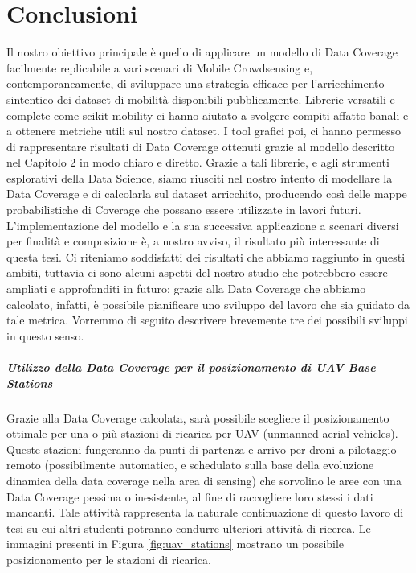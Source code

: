 \chapter{Conclusioni}

Il nostro obiettivo principale è quello di applicare un modello di Data Coverage facilmente replicabile a vari scenari di Mobile Crowdsensing e, contemporaneamente, di sviluppare una strategia efficace per l'arricchimento sintentico dei dataset di mobilità disponibili pubblicamente.
Librerie versatili e complete come scikit-mobility \cite{pappalardo2019scikitmobility} ci hanno aiutato a svolgere compiti affatto banali e a ottenere metriche utili sul nostro dataset. I tool grafici poi, ci hanno permesso di rappresentare risultati di Data Coverage ottenuti grazie al modello descritto nel Capitolo 2 in modo chiaro e diretto.
Grazie a tali librerie, e agli strumenti esplorativi della Data Science, siamo riusciti nel nostro intento di modellare la Data Coverage e di calcolarla sul dataset arricchito, producendo così delle mappe probabilistiche di Coverage che possano essere utilizzate in lavori futuri.
L'implementazione del modello e la sua successiva applicazione a scenari diversi per finalità e composizione è, a nostro avviso, il risultato più interessante di questa tesi.
Ci riteniamo soddisfatti dei risultati che abbiamo raggiunto in questi ambiti, tuttavia ci sono alcuni aspetti del nostro studio che potrebbero essere ampliati e approfonditi in futuro; grazie alla Data Coverage che abbiamo calcolato, infatti, è possibile pianificare uno sviluppo del lavoro che sia guidato da tale metrica.
Vorremmo di seguito descrivere brevemente tre dei possibili sviluppi in questo senso.

\paragraph*{Utilizzo della Data Coverage per il posizionamento di UAV Base Stations}
Grazie alla Data Coverage calcolata, sarà possibile scegliere il posizionamento ottimale per una o più stazioni di ricarica per UAV (unmanned aerial vehicles). Queste stazioni fungeranno da punti di partenza e arrivo per droni a pilotaggio remoto (possibilmente automatico, e schedulato sulla base della evoluzione dinamica della data coverage nella area di sensing) che sorvolino le aree con una Data Coverage pessima o inesistente, al fine di raccogliere loro stessi i dati mancanti.
Tale attività rappresenta la naturale
continuazione di questo lavoro di tesi su cui altri studenti potranno condurre ulteriori attività di ricerca.
Le immagini presenti in Figura \ref{fig:uav_stations} mostrano un possibile posizionamento per le stazioni di ricarica.

